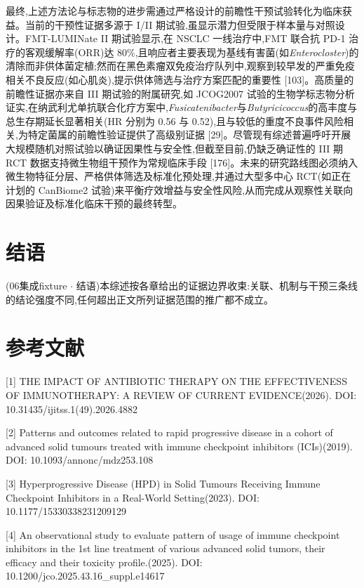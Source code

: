 最终,上述方法论与标志物的进步需通过严格设计的前瞻性干预试验转化为临床获益。当前的干预性证据多源于 I/II 期试验,虽显示潜力但受限于样本量与对照设计。FMT-LUMINate II 期试验显示,在 NSCLC 一线治疗中,FMT 联合抗 PD-1 治疗的客观缓解率(ORR)达 80\%,且响应者主要表现为基线有害菌(如\emph{Enterocloster})的清除而非供体菌定植;然而在黑色素瘤双免疫治疗队列中,观察到较早发的严重免疫相关不良反应(如心肌炎),提示供体筛选与治疗方案匹配的重要性 {[}103{]}。高质量的前瞻性证据亦来自 III 期试验的附属研究,如 JCOG2007 试验的生物学标志物分析证实,在纳武利尤单抗联合化疗方案中,\emph{Fusicatenibacter}与\emph{Butyricicoccus}的高丰度与总生存期延长显著相关(HR 分别为 0.56 与 0.52),且与较低的重度不良事件风险相关,为特定菌属的前瞻性验证提供了高级别证据 {[}29{]}。尽管现有综述普遍呼吁开展大规模随机对照试验以确证因果性与安全性,但截至目前,仍缺乏确证性的 III 期 RCT 数据支持微生物组干预作为常规临床手段 {[}176{]}。未来的研究路线图必须纳入微生物特征分层、严格供体筛选及标准化预处理,并通过大型多中心 RCT(如正在计划的 CanBiome2 试验)来平衡疗效增益与安全性风险,从而完成从观察性关联向因果验证及标准化临床干预的最终转型。

\section{结语}\label{ux7ed3ux8bed}

(06集成fixture \(\cdot\) 结语)本综述按各章给出的证据边界收束:关联、机制与干预三条线的结论强度不同,任何超出正文所列证据范围的推广都不成立。

\section{参考文献}\label{ux53c2ux8003ux6587ux732e}

{[}1{]} THE IMPACT OF ANTIBIOTIC THERAPY ON THE EFFECTIVENESS OF IMMUNOTHERAPY: A REVIEW OF CURRENT EVIDENCE(2026). DOI: 10.31435/ijitss.1(49).2026.4882

{[}2{]} Patterns and outcomes related to rapid progressive disease in a cohort of advanced solid tumours treated with immune checkpoint inhibitors (ICIs)(2019). DOI: 10.1093/annonc/mdz253.108

{[}3{]} Hyperprogressive Disease (HPD) in Solid Tumours Receiving Immune Checkpoint Inhibitors in a Real-World Setting(2023). DOI: 10.1177/15330338231209129

{[}4{]} An observational study to evaluate pattern of usage of immune checkpoint inhibitors in the 1st line treatment of various advanced solid tumors, their efficacy and their toxicity profile.(2025). DOI: 10.1200/jco.2025.43.16\_suppl.e14617


